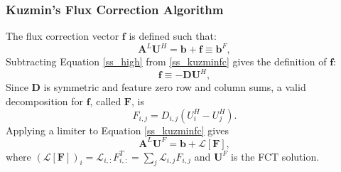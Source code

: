 \subsubsection{Kuzmin's Flux Correction Algorithm}
The flux correction vector $\mathbf{f}$ is defined such that:
\begin{equation}\label{ss_kuzminfc}
   \mathbf{A}^L\mathbf{U}^H = \mathbf{b} + \mathbf{f} \equiv \mathbf{b}^F,
\end{equation}
Subtracting Equation \ref{ss_high} from \ref{ss_kuzminfc} gives the definition of
$\mathbf{f}$:
\begin{equation}\label{ss_kuzminFdef}
   \mathbf{f} \equiv -\mathbf{D}\mathbf{U}^H,
\end{equation}
Since $\mathbf{D}$ is symmetric
and feature zero row and column sums, a valid decomposition for $\mathbf{f}$,
called $\mathbf{F}$, is
\begin{equation}
   F_{i,j} = D_{i,j}(U^H_i - U^H_j).
\end{equation}
Applying a limiter to Equation \ref{ss_kuzminfc} gives
\begin{equation}\label{ss_limited}
   \mathbf{A}^L\mathbf{U}^F = \mathbf{b} + \mathcal{L}[\mathbf{F}],
\end{equation}
where $(\mathcal{L}[\mathbf{F}])_i = \mathcal{L}_{i,:}F_{i,:}^T
= \sum\limits_j \mathcal{L}_{i,j}F_{i,j}$ and $\mathbf{U}^F$ is the FCT solution.

